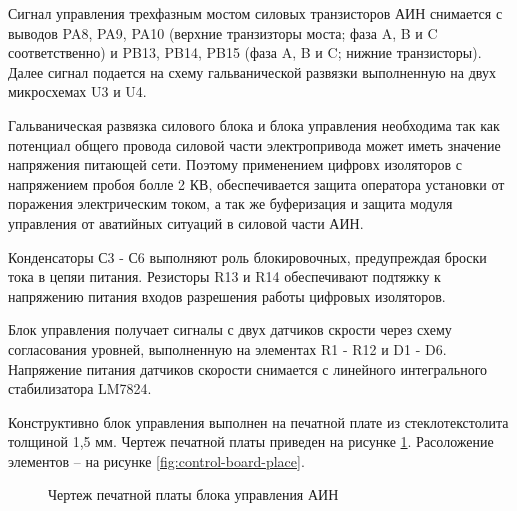         Сигнал управления трехфазным мостом силовых транзисторов АИН снимается
        с выводов PA8, PA9, PA10 (верхние транзизторы моста; фаза A, B и C
        соответственно) и PB13, PB14, PB15 (фаза A, B и C; нижние транзисторы).
        Далее сигнал подается на схему гальванической развязки выполненную на
        двух микросхемах U3 и U4. 
        
        Гальваническая развязка силового блока и блока управления необходима
        так как потенциал общего провода силовой части электропривода может
        иметь значение напряжения питающей сети. Поэтому применением цифровх
        изоляторов с напряжением пробоя болле 2 КВ, обеспечивается защита
        оператора установки от поражения электрическим током, а так же
        буферизация и защита модуля управления от аватийных ситуаций в силовой
        части АИН.

        Конденсаторы С3 - С6 выполняют роль блокировочных, предупреждая броски
        тока в цепяи питания. Резисторы R13 и R14 обеспечивают подтяжку к
        напряжению питания входов разрешения работы цифровых изоляторов.

        Блок управления получает сигналы с двух датчиков скрости через схему
        согласования уровней, выполненную на элементах R1 - R12 и D1 - D6.
        Напряжение питания датчиков скорости снимается с линейного
        интегрального стабилизатора LM7824.

        Конструктивно блок управления выполнен на печатной плате из
        стеклотекстолита толщиной 1,5 мм. Чертеж печатной платы приведен на
        рисунке \ref{fig:control-board-route}. Расоложение элементов -- на
        рисунке \ref{fig:control-board-place}.

        \begin{figure}[h!]
            \caption{Чертеж печатной платы блока управления АИН}
            \label{fig:control-board-route}
        \end{figure}

